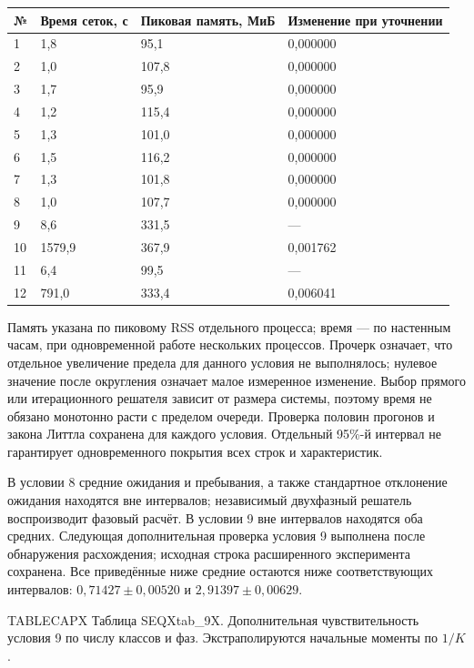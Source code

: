 \setlength{\tabcolsep}{2pt}
\begin{tabular}{p{0.94cm}p{4.25cm}p{4.72cm}p{5.67cm}}
\toprule
№ & Время сеток, с & Пиковая память, МиБ & Изменение при уточнении \\
\midrule
1 & 1,8 & 95,1 & 0,000000 \\
2 & 1,0 & 107,8 & 0,000000 \\
3 & 1,7 & 95,9 & 0,000000 \\
4 & 1,2 & 115,4 & 0,000000 \\
5 & 1,3 & 101,0 & 0,000000 \\
6 & 1,5 & 116,2 & 0,000000 \\
7 & 1,3 & 101,8 & 0,000000 \\
8 & 1,0 & 107,7 & 0,000000 \\
9 & 8,6 & 331,5 & — \\
10 & 1579,9 & 367,9 & 0,001762 \\
11 & 6,4 & 99,5 & — \\
12 & 791,0 & 333,4 & 0,006041 \\
\bottomrule
\end{tabular}




Память указана по пиковому RSS отдельного процесса; время --- по настенным часам, при одновременной работе нескольких процессов. Прочерк означает, что отдельное увеличение предела для данного условия не выполнялось; нулевое значение после округления означает малое измеренное изменение. Выбор прямого или итерационного решателя зависит от размера системы, поэтому время не обязано монотонно расти с пределом очереди. Проверка половин прогонов и закона Литтла сохранена для каждого условия. Отдельный 95\%-й интервал не гарантирует одновременного покрытия всех строк и характеристик.

В условии 8 средние ожидания и пребывания, а также стандартное отклонение ожидания находятся вне интервалов; независимый двухфазный решатель воспроизводит фазовый расчёт. В условии 9 вне интервалов находятся оба средних. Следующая дополнительная проверка условия 9 выполнена после обнаружения расхождения; исходная строка расширенного эксперимента сохранена. Все приведённые ниже средние остаются ниже соответствующих интервалов: \(0{,}71427\pm0{,}00520\) и \(2{,}91397\pm0{,}00629\).

\noindent TABLECAPX Таблица SEQXtab_9X. Дополнительная чувствительность условия 9 по числу классов и фаз. Экстраполируются начальные моменты по \(1/K\).\par

